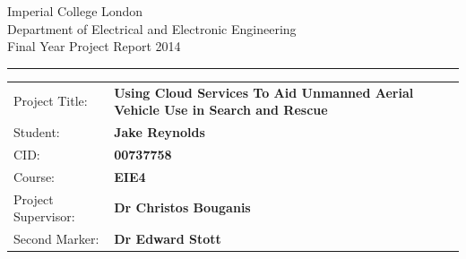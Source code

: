 \documentclass{article}
\begin{document}
\begin{titlepage}
                \setlength{\parindent}{0pt}
                \setlength{\parskip}{0pt}

                {
                                \Large
                                \raggedright
                                Imperial College London\\[17pt]
                                Department of Electrical and Electronic Engineering\\[17pt]
                                Final Year Project Report 2014\\[17pt]
 
                }

                \rule{\columnwidth}{3pt}
                \vfill
                \centering
                
                \vfill
                \setlength{\tabcolsep}{0pt}

                \begin{tabular}{p{40mm}p{\dimexpr\columnwidth-40mm}}
                                Project Title: & \textbf{Using Cloud Services To Aid Unmanned Aerial Vehicle Use in Search and Rescue} \\[12pt]
                                Student: & \textbf{Jake Reynolds} \\[12pt]
                                CID: & \textbf{00737758} \\[12pt]
                                Course: & \textbf{EIE4} \\[12pt]
                                Project Supervisor: & \textbf{Dr Christos Bouganis} \\[12pt]
                                Second Marker: & \textbf{Dr Edward Stott} \\
                \end{tabular}
\end{titlepage}
\end{document}
